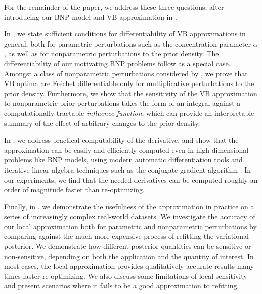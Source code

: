 
For the remainder of the paper, we address these three questions, after
introducing our BNP model and VB approximation in .

In , we state sufficient conditions for
differentiability of VB approximations in general, both for parametric
perturbations such as the concentration parameter $\alpha$, as well as for
nonparametric perturbations to the prior density.  The differentiability of our
motivating BNP problems follow as a special case.  Amongst a class of
nonparametric perturbations considered by \citet{gustafson:1996:local}, we prove
that VB optima are Fr{\'e}chet differentiable only for multiplicative
perturbations to the prior density.  Furthermore, we show that the sensitivity
of the VB approximation to nonparametric prior perturbations takes the form of
an integral against a computationally tractable \textit{influence function},
which can provide an interpretable summary of the effect of arbitrary changes to
the prior density.

In , we address practical computability of the
derivative, and show that the approximation can be easily and efficiently
computed even in high-dimensional problems like BNP models, using modern
automatic differentiation tools \citep{baydin:2018:automatic, jax2018github} and
iterative linear algebra techniques such as the conjugate gradient algorithm
\citep{nocedal:2006:numerical}.  In our experiments, we find that the  needed
derivatives can be computed roughly an order of magnitude faster than
re-optimizing.

Finally, in , we demonstrate the usefulness of the approximation
in practice on a series of increasingly complex real-world datasets.  We
investigate the accuracy of our local approximation both for parametric and
nonparametric perturbations by comparing against the much more expensive process
of refitting the variational posterior.  We demonstrate how different posterior
quantities can be sensitive or non-sensitive, depending on both the application
and the quantity of interest.  In most cases, the local approximation provides
qualitatively accurate results many times faster re-optimizing.  We also discuss
some limitations of local sensitivity and present scenarios where it fails to be
a good approximation to refitting.

